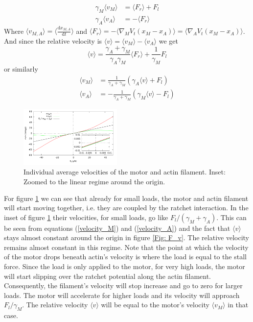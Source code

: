 \documentclass[aps,pre,twocolumn,showpacs,showkeys,a4paper]{revtex4}
\newcommand{\rmd}{{\mathrm d}}
\begin{document}
\begin{align*}
\gamma_M \langle v_M \rangle &= \langle F_r \rangle + F_l \\
\gamma_A \langle v_A \rangle &= -\langle F_r \rangle
\end{align*}
Where $\langle v_{M,A} \rangle = \langle \frac{\rmd x_{M,A}}{\rmd t} \rangle$ 
and $\langle F_r \rangle = - \langle \nabla_M V_t(x_M - x_A ) \rangle = \langle \nabla_A V_t(x_M - x_A ) \rangle $. 
And since the relative velocity is $\langle v \rangle = \langle v_{M} \rangle - \langle v_{A} \rangle$ we get
\begin{equation*}
\langle v \rangle = \frac{\gamma_A + \gamma_M}{\gamma_A \gamma_M} \langle F_r \rangle + \frac{1}{\gamma_M} F_l
\end{equation*}
or similarly
\begin{align}
\langle v_M \rangle &= \frac{1}{ \gamma_A + \gamma_M } \left( \gamma_A \langle v \rangle + F_l \right) \label{velocity_M} \\
\langle v_A \rangle &= -\frac{1}{ \gamma_A + \gamma_M } \left( \gamma_M \langle v \rangle - F_l \right)
\label{velocity_A}
\end{align}

\begin{figure}[t]
\centering
\includegraphics[width=0.45\textwidth,height=!]{individual_velocities}
\caption{Individual average velocities of the motor and actin filament. Inset: Zoomed to the linear regime around the origin.}
\label{Fig: ind_v} 
\end{figure}
For figure \ref{Fig: ind_v} we can see that already for small loads, the motor and actin filament will start moving together, i.e. they are coupled by the ratchet interaction. 
In the inset of figure \ref{Fig: ind_v} their velocities, for small loads, go like $F_l/(\gamma_M + \gamma_A)$. 
This can be seen from equations (\ref{velocity_M}) and (\ref{velocity_A}) and the fact that $\langle v \rangle$ stays almost constant around the origin in figure \ref{Fig: F_v}. 
The relative velocity remains almost constant in this regime.
Note that the point at which the velocity of the motor drops beneath actin's velocity is where the load is equal to the stall force.
Since the load is only applied to the motor, for very high loads, the motor will start slipping over the ratchet potential along the actin filament. 
Consequently, the filament's velocity will stop increase and go to zero for larger loads. 
The motor will accelerate for higher loads and its velocity will approach $F_l/\gamma_M$. 
The relative velocity $\langle v \rangle$ will be equal to the motor's velocity $\langle v_M \rangle$ in that case.
\end{document}
